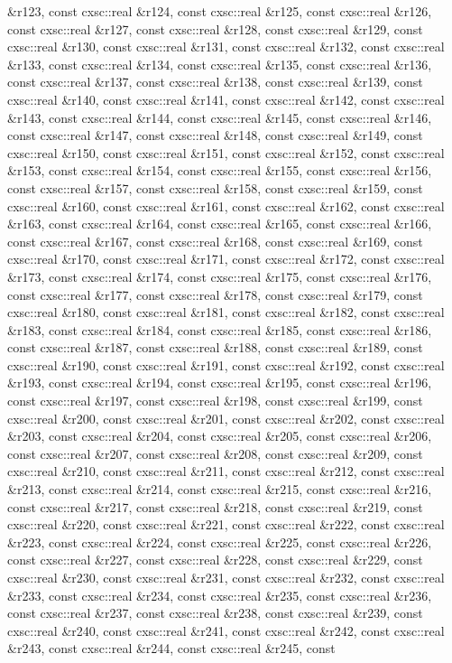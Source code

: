 \begin{DoxyCompactItemize}
\&r123, const cxsc\-::real \&r124, const cxsc\-::real \&r125, const cxsc\-::real \&r126, const cxsc\-::real \&r127, const cxsc\-::real \&r128, const cxsc\-::real \&r129, const cxsc\-::real \&r130, const cxsc\-::real \&r131, const cxsc\-::real \&r132, const cxsc\-::real \&r133, const cxsc\-::real \&r134, const cxsc\-::real \&r135, const cxsc\-::real \&r136, const cxsc\-::real \&r137, const cxsc\-::real \&r138, const cxsc\-::real \&r139, const cxsc\-::real \&r140, const cxsc\-::real \&r141, const cxsc\-::real \&r142, const cxsc\-::real \&r143, const cxsc\-::real \&r144, const cxsc\-::real \&r145, const cxsc\-::real \&r146, const cxsc\-::real \&r147, const cxsc\-::real \&r148, const cxsc\-::real \&r149, const cxsc\-::real \&r150, const cxsc\-::real \&r151, const cxsc\-::real \&r152, const cxsc\-::real \&r153, const cxsc\-::real \&r154, const cxsc\-::real \&r155, const cxsc\-::real \&r156, const cxsc\-::real \&r157, const cxsc\-::real \&r158, const cxsc\-::real \&r159, const cxsc\-::real \&r160, const cxsc\-::real \&r161, const cxsc\-::real \&r162, const cxsc\-::real \&r163, const cxsc\-::real \&r164, const cxsc\-::real \&r165, const cxsc\-::real \&r166, const cxsc\-::real \&r167, const cxsc\-::real \&r168, const cxsc\-::real \&r169, const cxsc\-::real \&r170, const cxsc\-::real \&r171, const cxsc\-::real \&r172, const cxsc\-::real \&r173, const cxsc\-::real \&r174, const cxsc\-::real \&r175, const cxsc\-::real \&r176, const cxsc\-::real \&r177, const cxsc\-::real \&r178, const cxsc\-::real \&r179, const cxsc\-::real \&r180, const cxsc\-::real \&r181, const cxsc\-::real \&r182, const cxsc\-::real \&r183, const cxsc\-::real \&r184, const cxsc\-::real \&r185, const cxsc\-::real \&r186, const cxsc\-::real \&r187, const cxsc\-::real \&r188, const cxsc\-::real \&r189, const cxsc\-::real \&r190, const cxsc\-::real \&r191, const cxsc\-::real \&r192, const cxsc\-::real \&r193, const cxsc\-::real \&r194, const cxsc\-::real \&r195, const cxsc\-::real \&r196, const cxsc\-::real \&r197, const cxsc\-::real \&r198, const cxsc\-::real \&r199, const cxsc\-::real \&r200, const cxsc\-::real \&r201, const cxsc\-::real \&r202, const cxsc\-::real \&r203, const cxsc\-::real \&r204, const cxsc\-::real \&r205, const cxsc\-::real \&r206, const cxsc\-::real \&r207, const cxsc\-::real \&r208, const cxsc\-::real \&r209, const cxsc\-::real \&r210, const cxsc\-::real \&r211, const cxsc\-::real \&r212, const cxsc\-::real \&r213, const cxsc\-::real \&r214, const cxsc\-::real \&r215, const cxsc\-::real \&r216, const cxsc\-::real \&r217, const cxsc\-::real \&r218, const cxsc\-::real \&r219, const cxsc\-::real \&r220, const cxsc\-::real \&r221, const cxsc\-::real \&r222, const cxsc\-::real \&r223, const cxsc\-::real \&r224, const cxsc\-::real \&r225, const cxsc\-::real \&r226, const cxsc\-::real \&r227, const cxsc\-::real \&r228, const cxsc\-::real \&r229, const cxsc\-::real \&r230, const cxsc\-::real \&r231, const cxsc\-::real \&r232, const cxsc\-::real \&r233, const cxsc\-::real \&r234, const cxsc\-::real \&r235, const cxsc\-::real \&r236, const cxsc\-::real \&r237, const cxsc\-::real \&r238, const cxsc\-::real \&r239, const cxsc\-::real \&r240, const cxsc\-::real \&r241, const cxsc\-::real \&r242, const cxsc\-::real \&r243, const cxsc\-::real \&r244, const cxsc\-::real \&r245, const 
\end{DoxyCompactItemize}
